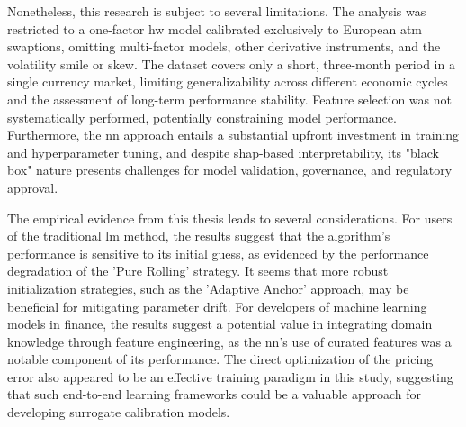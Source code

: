 Nonetheless, this research is subject to several limitations. The analysis was restricted to a one-factor \ac{hw} model calibrated exclusively to European \ac{atm} swaptions, omitting multi-factor models, other derivative instruments, and the volatility smile or skew. The dataset covers only a short, three-month period in a single currency market, limiting generalizability across different economic cycles and the assessment of long-term performance stability. Feature selection was not systematically performed, potentially constraining model performance. Furthermore, the \ac{nn} approach entails a substantial upfront investment in training and hyperparameter tuning, and despite \ac{shap}-based interpretability, its "black box" nature presents challenges for model validation, governance, and regulatory approval.

The empirical evidence from this thesis leads to several considerations. For users of the traditional \ac{lm} method, the results suggest that the algorithm's performance is sensitive to its initial guess, as evidenced by the performance degradation of the 'Pure Rolling' strategy. It seems that more robust initialization strategies, such as the 'Adaptive Anchor' approach, may be beneficial for mitigating parameter drift. For developers of machine learning models in finance, the results suggest a potential value in integrating domain knowledge through feature engineering, as the \ac{nn}'s use of curated features was a notable component of its performance. The direct optimization of the pricing error also appeared to be an effective training paradigm in this study, suggesting that such end-to-end learning frameworks could be a valuable approach for developing surrogate calibration models. 

